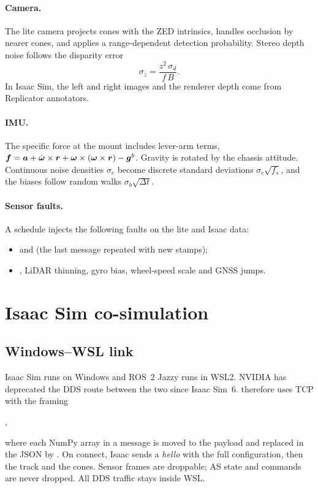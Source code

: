 \documentclass[11pt]{article}
\begin{document}
\paragraph{Camera.} The lite camera projects cones with the ZED intrinsics, handles occlusion by nearer cones, and
applies a range-dependent detection probability. Stereo depth noise follows the disparity error
\begin{equation}
\sigma_z = \frac{z^2\,\sigma_d}{f\,B}.
\end{equation}
In Isaac Sim, the left and right images and the renderer depth come from Replicator annotators.

\paragraph{IMU.} The specific force at the mount includes lever-arm terms,
$\bm{f} = \bm{a} + \dot{\bm{\omega}}\times\bm{r} + \bm{\omega}\times(\bm{\omega}\times\bm{r}) - \bm{g}^{b}$.
Gravity is rotated by the chassis attitude. Continuous noise densities $\sigma_c$ become discrete standard
deviations $\sigma_c\sqrt{f_s}$, and the biases follow random walks $\sigma_b\sqrt{\Delta t}$.

\paragraph{Sensor faults.} A schedule  injects the following
faults on the lite and Isaac data:
\begin{itemize}
  \item {} and  (the last message repeated with new stamps);
  \item {}, LiDAR thinning, gyro bias, wheel-speed scale and GNSS jumps.
\end{itemize}

\section{Isaac Sim co-simulation}\label{sec:isaac}
\subsection{Windows--WSL link}
Isaac Sim runs on Windows and ROS~2 Jazzy runs in WSL2. NVIDIA has deprecated the DDS route between the two since
Isaac Sim~6.  therefore uses TCP with the framing
\begin{center}
,
\end{center}
where each NumPy array in a message is moved to the payload and replaced in the JSON by
. On connect, Isaac sends a \emph{hello} with the full
configuration, then the track and the cones. Sensor frames are droppable; AS state and commands are never dropped.
All DDS traffic stays inside WSL.
\end{document}
